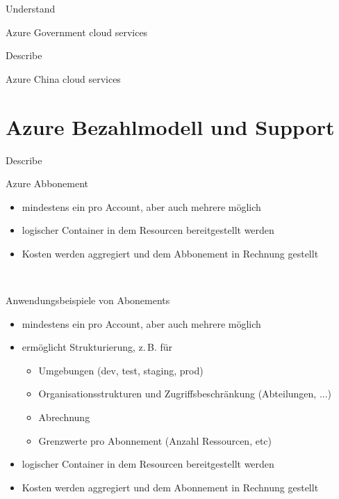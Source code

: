 \documentclass{scrartcl}
\newenvironment{flashcard}[2][]{%
    #1
    \vfill
    \centerline{\Large{#2}}
    \vfill
\newpage
}
{\newpage}
\newcommand{\sectioncard}[1]{
    \vspace*{\stretch{1}}
    \section{#1}
    \vspace*{\stretch{1}}
    \pagebreak
}
\begin{document}
    \begin{flashcard}[Understand]{Azure Government cloud services}

    \end{flashcard}

    \begin{flashcard}[Describe]{Azure China cloud services}

    \end{flashcard}

    \sectioncard{Azure Bezahlmodell und Support}

    \begin{flashcard}[Describe]{Azure Abbonement}
        \begin{itemize}
            \item mindestens ein pro Account, aber auch mehrere möglich
            \item logischer Container in dem Resourcen bereitgestellt werden
            \item Kosten werden aggregiert und dem Abbonement in Rechnung gestellt
        \end{itemize}
    \end{flashcard}

    \begin{flashcard}[\ ]{Anwendungsbeispiele von Abonements}
        \begin{itemize}
            \item mindestens ein pro Account, aber auch mehrere möglich
            \item ermöglicht Strukturierung, z.\,B. für
            \begin{itemize}
                \item Umgebungen (dev, test, staging, prod)
                \item Organisationsstrukturen und Zugriffsbeschränkung (Abteilungen, ...)
                \item Abrechnung
                \item Grenzwerte pro Abonnement (Anzahl Ressourcen, etc)
            \end{itemize}
            \item logischer Container in dem Resourcen bereitgestellt werden
            \item Kosten werden aggregiert und dem Abonnement in Rechnung gestellt
        \end{itemize}
    \end{flashcard}
\end{document}
